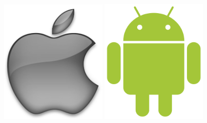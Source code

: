 
\begin{frame}
    \frametitle{}

    \begin{center}
        \includegraphics[width=0.4\textwidth]{img/apple.jpg}
        \includegraphics[width=0.4\textwidth]{img/android.png}
    \end{center}

\end{frame}


